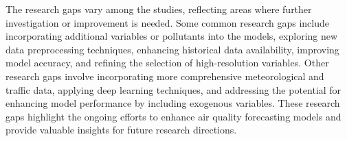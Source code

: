 \documentclass[a4paper, fleqn]{cas-sc}
\theoremstyle{definition}
\theoremstyle{remark}
\begin{document}
\par The research gaps vary among the studies, reflecting areas where further investigation or improvement is needed. Some common research gaps include incorporating additional variables or pollutants into the models, exploring new data preprocessing techniques, enhancing historical data availability, improving model accuracy, and refining the selection of high-resolution variables. Other research gaps involve incorporating more comprehensive meteorological and traffic data, applying deep learning techniques, and addressing the potential for enhancing model performance by including exogenous variables. These research gaps highlight the ongoing efforts to enhance air quality forecasting models and provide valuable insights for future research directions.
\end{document}

